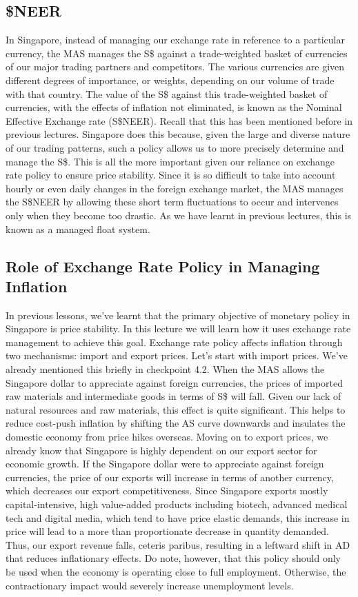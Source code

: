 \documentclass[DIV=classic,11pt,numbers=noenddot,listof=totoc,bibliography=totoc,parskip]{scrartcl}
\begin{document}
\subsection{\$NEER}
In Singapore, instead of managing our exchange rate in reference to a particular currency, the MAS manages the S\$ against a trade-weighted basket of currencies of our major trading partners and competitors. The various currencies are given different degrees of importance, or weights, depending on our volume of trade with that country. The value of the S\$ against this trade-weighted basket of currencies, with the effects of inflation not eliminated, is known as the Nominal Effective Exchange rate (S\$NEER). Recall that this has been mentioned before in previous lectures. Singapore does this because, given the large and diverse nature of our trading patterns, such a policy allows us to more precisely determine and manage the S\$. This is all the more important given our reliance on exchange rate policy to ensure price stability. Since it is so difficult to take into account hourly or even daily changes in the foreign exchange market, the MAS manages the S\$NEER by allowing these short term fluctuations to occur and intervenes only when they become too drastic. As we have learnt in previous lectures, this is known as a managed float system.  
\subsection{Role of Exchange Rate Policy in Managing Inflation}
In previous lessons, we’ve learnt that the primary objective of monetary policy in Singapore is price stability. In this lecture we will learn how it uses exchange rate management to achieve this goal. Exchange rate policy affects inflation through two mechanisms: import and export prices. Let’s start with import prices. We’ve already mentioned this briefly in checkpoint 4.2. When the MAS allows the Singapore dollar to appreciate against foreign currencies, the prices of imported raw materials and intermediate goods in terms of S\$ will fall. Given our lack of natural resources and raw materials, this effect is quite significant. This helps to reduce cost-push inflation by shifting the AS curve downwards and insulates the domestic economy from price hikes overseas. Moving on to export prices, we already know that Singapore is highly dependent on our export sector for economic growth. If the Singapore dollar were to appreciate against foreign currencies, the price of our exports will increase in terms of another currency, which decreases our export competitiveness. Since Singapore exports mostly capital-intensive, high value-added products including biotech, advanced medical tech and digital media, which tend to have price elastic demands, this increase in price will lead to a more than proportionate decrease in quantity demanded. Thus, our export revenue falls, ceteris paribus, resulting in a leftward shift in AD that reduces inflationary effects. Do note, however, that this policy should only be used when the economy is operating close to full employment. Otherwise, the contractionary impact would severely increase unemployment levels.
\end{document}
